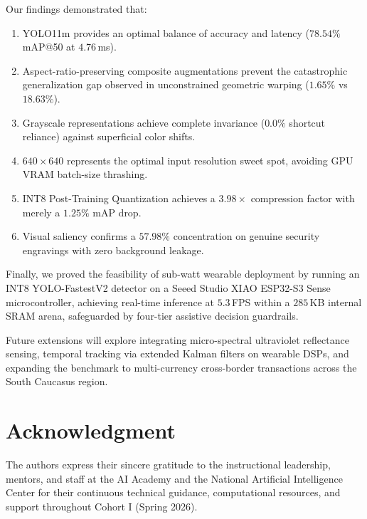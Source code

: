 \documentclass[conference]{IEEEtran}
\begin{document}
Our findings demonstrated that:
\begin{enumerate}
    \item YOLO11m provides an optimal balance of accuracy and latency ($78.54\%$ mAP@50 at $4.76$\,ms).
    \item Aspect-ratio-preserving composite augmentations prevent the catastrophic generalization gap observed in unconstrained geometric warping ($1.65\%$ vs $18.63\%$).
    \item Grayscale representations achieve complete invariance ($0.0\%$ shortcut reliance) against superficial color shifts.
    \item $640 \times 640$ represents the optimal input resolution sweet spot, avoiding GPU VRAM batch-size thrashing.
    \item INT8 Post-Training Quantization achieves a $3.98\times$ compression factor with merely a $1.25\%$ mAP drop.
    \item Visual saliency confirms a $57.98\%$ concentration on genuine security engravings with zero background leakage.
\end{enumerate}

Finally, we proved the feasibility of sub-watt wearable deployment by running an INT8 YOLO-FastestV2 detector on a Seeed Studio XIAO ESP32-S3 Sense microcontroller, achieving real-time inference at $5.3$\,FPS within a $285$\,KB internal SRAM arena, safeguarded by four-tier assistive decision guardrails.

Future extensions will explore integrating micro-spectral ultraviolet reflectance sensing, temporal tracking via extended Kalman filters on wearable DSPs, and expanding the benchmark to multi-currency cross-border transactions across the South Caucasus region.

\section*{Acknowledgment}
The authors express their sincere gratitude to the instructional leadership, mentors, and staff at the AI Academy and the National Artificial Intelligence Center for their continuous technical guidance, computational resources, and support throughout Cohort I (Spring 2026).
\end{document}
